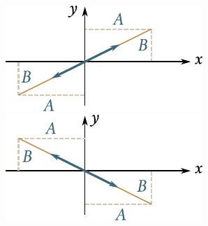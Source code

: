 \begin{figure}[t]
	\begin{minipage}[t]{0.5\linewidth}
		\begin{center}
			\includegraphics[scale=0.95]{figures/ch_07/fig_7_13.pdf}
			\caption[]{}
			\label{fig:7_13}
		\end{center}
	\end{minipage}
	\hspace{-0.0cm}
	\begin{minipage}[t]{0.5\linewidth}
		\begin{center}
			\includegraphics[scale=0.95]{figures/ch_07/fig_7_14.pdf}
			\caption[]{}
			\label{fig:7_14}
		\end{center}
	\end{minipage}
	\vspace{-0.6cm}
\end{figure}

